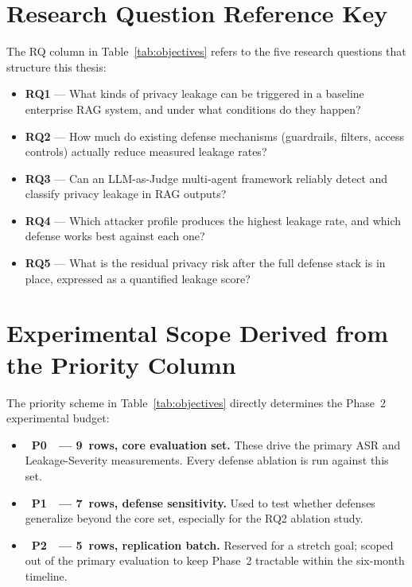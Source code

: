 \documentclass[a4paper,12pt]{report}
\newcommand{\prioHigh}{\colorbox{prioP0}{\color{white}\small\textbf{~\textsf{P0}~}}}
\newcommand{\prioMed}{\colorbox{prioP1}{\color{white}\small\textbf{~\textsf{P1}~}}}
\newcommand{\prioLow}{\colorbox{prioP2}{\color{white}\small\textbf{~\textsf{P2}~}}}
\begin{document}
\section{Research Question Reference Key}

The RQ column in Table~\ref{tab:objectives} refers to the five research
questions that structure this thesis:

\begin{itemize}[leftmargin=1.8em, itemsep=5pt]
  \item \textbf{RQ1} --- What kinds of privacy leakage can be triggered in
        a baseline enterprise RAG system, and under what conditions do they
        happen?
  \item \textbf{RQ2} --- How much do existing defense mechanisms
        (guardrails, filters, access controls) actually reduce measured
        leakage rates?
  \item \textbf{RQ3} --- Can an LLM-as-Judge multi-agent framework
        reliably detect and classify privacy leakage in RAG outputs?
  \item \textbf{RQ4} --- Which attacker profile produces the highest
        leakage rate, and which defense works best against each one?
  \item \textbf{RQ5} --- What is the residual privacy risk after the full
        defense stack is in place, expressed as a quantified leakage score?
\end{itemize}

\section{Experimental Scope Derived from the Priority Column}

The priority scheme in Table~\ref{tab:objectives} directly determines the
Phase~2 experimental budget:

\begin{itemize}[leftmargin=1.8em, itemsep=3pt]
  \item \prioHigh\ \textbf{--- 9~rows, core evaluation set.} These drive
        the primary ASR and Leakage-Severity measurements. Every defense
        ablation is run against this set.
  \item \prioMed\ \textbf{--- 7~rows, defense sensitivity.} Used to test
        whether defenses generalize beyond the core set, especially for
        the RQ2 ablation study.
  \item \prioLow\ \textbf{--- 5~rows, replication batch.} Reserved for a
        stretch goal; scoped out of the primary evaluation to keep
        Phase~2 tractable within the six-month timeline.
\end{itemize}
\end{document}
